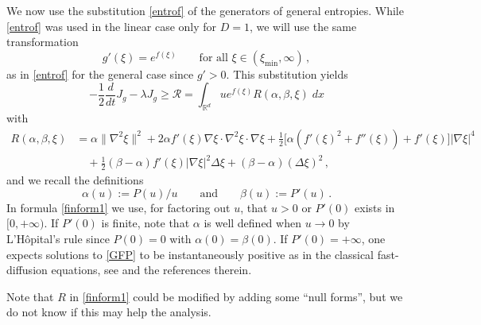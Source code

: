 \documentclass[reqno]{amsart}
\newcommand{\R}{\mathbb{R}}
\begin{document}
We now use the substitution \eqref{entrof} of the generators of general entropies. 
While \eqref{entrof} was used in the linear case only for $D=1$, we will use the same transformation 
\begin{equation}\label{entrofgen}
    g'(\xi)=e^{f(\xi)} \qquad \mbox{for all } \xi\in(\xi_{\min},\infty)\,,
\end{equation} 
as in \eqref{entrof} for the general case since $g'>0$. This substitution yields
\begin{equation}\label{finform1}
  -\frac12\frac{d}{dt}J_g - \lambda J_g\ge \mathcal{R} =\int_{\R^d} u e^{f(\xi)} R(\alpha,\beta,\xi) \;dx
\end{equation}
with
\begin{align}
R(\alpha,\beta,\xi) &=  \alpha \|\nabla^2\xi\|^2 
                        + 2 \alpha f'(\xi)\nabla\xi\cdot\nabla^2\xi\cdot\nabla\xi 
                        + \frac12 \big[\alpha (f'(\xi)^2+f''(\xi))+f'(\xi)\big]|\nabla\xi|^4 \nonumber\\
                        &\quad+ \frac12 (\beta-\alpha)f'(\xi)|\nabla\xi|^2\Delta\xi 
                        + (\beta-\alpha)(\Delta\xi)^2\,, 
\label{finform2}
\end{align}
and we recall the definitions 
\begin{equation}\label{finform3}
  \alpha(u):=P(u)/u \qquad \mbox{and} \qquad \beta(u):=P'(u) \,. 
\end{equation}
In formula \eqref{finform1} we use, for factoring out $u$, that $u>0$ or $P'(0)$ exists in $[0,+\infty)$. If $P'(0)$ is finite, note that $\alpha$ is well defined when $u\to 0$ by L'H\^opital's rule since $P(0)=0$ with $\alpha(0)=\beta(0)$. If $P'(0)=+\infty$, one expects solutions to \eqref{GFP} to be instantaneously positive as in the classical fast-diffusion equations, see \cite{VazquezPME} and the references therein. 

Note that $R$ in \eqref{finform1} could be modified by adding some ``null forms'', but we do not know if this may help the analysis.
\end{document}
